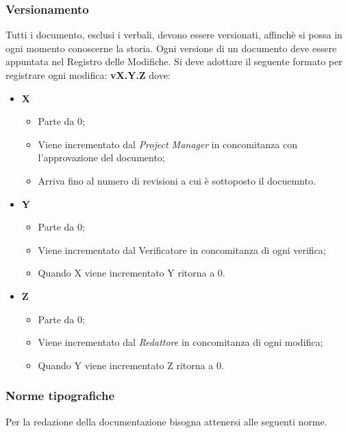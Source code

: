 	\subsubsection{Versionamento}
	\label{versionamento}
	Tutti i documento, esclusi i verbali, devono essere versionati, affinchè si possa in ogni momento conoscerne la storia. Ogni versione di un documento deve essere appuntata nel Registro delle Modifiche. Si deve adottare il seguente formato per registrare ogni modifica: 
	\textbf{v{X}.{Y}.{Z}}
	dove:
	\begin{itemize}
		\item \textbf{X}
		\begin{itemize}
			\item Parte da 0;
			\item Viene incrementato dal \textit{Project Manager} in concomitanza con l'approvazione del documento;
			\item Arriva fino al numero di revisioni a cui è sottoposto il docuemnto.
		\end{itemize}
		
		\item \textbf{Y}
		\begin{itemize}
			\item Parte da 0;
			\item Viene incrementato dal Verificatore in concomitanza di ogni verifica;
			\item Quando X viene incrementato Y ritorna a 0.
		\end{itemize}
		
		\item \textbf{Z}
		\begin{itemize}
			\item Parte da 0;
			\item Viene incrementato dal \textit{Redattore} in concomitanza di ogni modifica;
			\item Quando Y viene incrementato Z	 ritorna a 0.
		\end{itemize}
		
	\end{itemize}
	
	\subsubsection{Norme tipografiche} 
	Per la redazione della documentazione bisogna attenersi alle seguenti norme.
		

